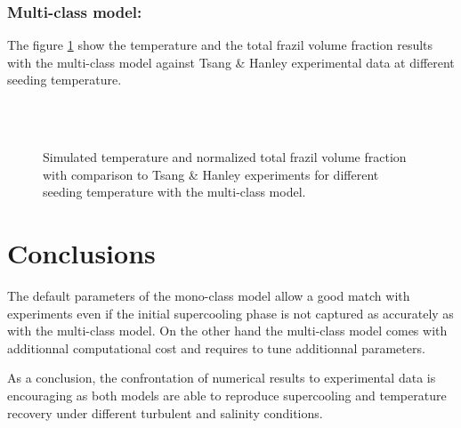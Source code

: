 \subsubsection{Multi-class model:}

The figure \ref{fig:tsang_multiclass}
show the temperature and the total frazil volume fraction results with the multi-class 
model against Tsang \& Hanley experimental data at different seeding temperature.

\begin{figure}[H]
    \begin{center}
        \\
        \\
    \end{center}
    \caption{Simulated temperature and normalized total frazil volume fraction with comparison to Tsang \& Hanley experiments for different seeding temperature with the multi-class model.}
    \label{fig:tsang_multiclass}
\end{figure}

\section{Conclusions}

The default parameters of the mono-class model allow a good match with experiments even if the initial supercooling 
phase is not captured as accurately as with the multi-class model.
On the other hand the multi-class model comes with additionnal computational cost and requires to tune additionnal parameters.

As a conclusion, the confrontation of numerical results to experimental data is 
encouraging as both models are able to reproduce supercooling and temperature recovery 
under different turbulent and salinity conditions.

\renewcommand{\labelitemi}{\textbullet}
